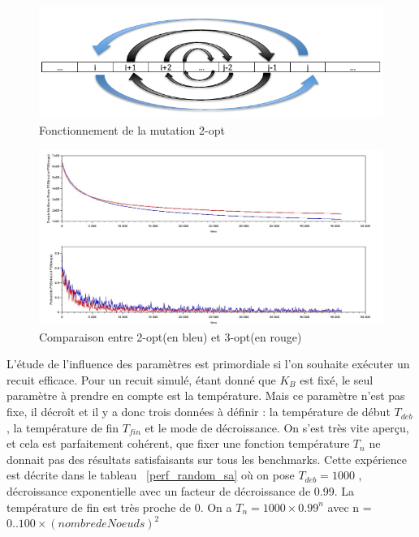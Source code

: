 \documentclass{article}%
\begin{document}
	\begin{figure}[!h]
		
	\begin{center}
	\includegraphics[scale=0.25]{2opt.png}
	\caption{Fonctionnement de la mutation 2-opt}
	\label{2opt}
	\end{center}
	\end{figure}
	
	\begin{figure}[!h]
		
	\begin{center}
	\includegraphics[scale=0.25]{pr1002_mutation.jpg}
	\caption{Comparaison entre 2-opt(en bleu) et 3-opt(en rouge)}
	\label{mutations}
	\end{center}
	\end{figure}
			
			L'étude de l'influence des paramètres est primordiale si l'on souhaite exécuter un recuit efficace. Pour un recuit simulé, étant donné que $ K_{B} $ est fixé, le seul paramètre à prendre en compte est la température. Mais ce paramètre n'est pas fixe, il décroît et il y a donc trois données à définir : la température de début $ T_{deb} $, la température de fin $T_{fin} $ et le mode de décroissance. On s'est très vite aperçu, et cela est parfaitement cohérent, que fixer une fonction température $ T_{n} $ ne donnait pas des résultats satisfaisants sur tous les benchmarks. Cette expérience est décrite dans le tableau ~\ref{perf_random_sa} où on pose $ T_{deb} = 1000 $ , décroissance exponentielle avec un facteur de décroissance de 0.99. La température de fin est très proche de 0. On a $ T_{n} = 1000 \times 0.99^{n} $ avec n = $0..100 \times (nombre de Noeuds)^2 $
			
\end{document}
